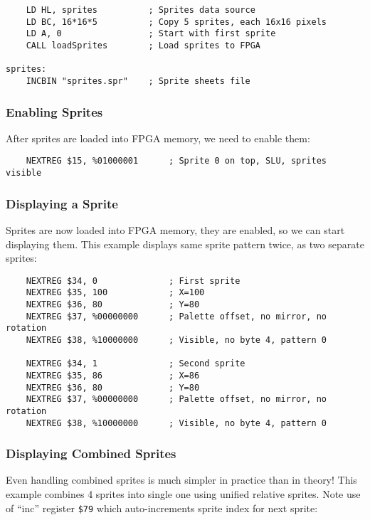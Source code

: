 \begin{lstlisting}
    LD HL, sprites          ; Sprites data source
    LD BC, 16*16*5          ; Copy 5 sprites, each 16x16 pixels
    LD A, 0                 ; Start with first sprite
    CALL loadSprites        ; Load sprites to FPGA

sprites:
    INCBIN "sprites.spr"    ; Sprite sheets file
\end{lstlisting}


\subsubsection{Enabling Sprites}

After sprites are loaded into FPGA memory, we need to enable them:

\begin{lstlisting}
    NEXTREG $15, %01000001		; Sprite 0 on top, SLU, sprites visible
\end{lstlisting}


\subsubsection{Displaying a Sprite}

Sprites are now loaded into FPGA memory, they are enabled, so we can start displaying them. This example displays same sprite pattern twice, as two separate sprites:

\begin{lstlisting}
    NEXTREG $34, 0              ; First sprite
    NEXTREG $35, 100            ; X=100
    NEXTREG $36, 80             ; Y=80
    NEXTREG $37, %00000000      ; Palette offset, no mirror, no rotation
    NEXTREG $38, %10000000      ; Visible, no byte 4, pattern 0

    NEXTREG $34, 1              ; Second sprite
    NEXTREG $35, 86             ; X=86
    NEXTREG $36, 80             ; Y=80
    NEXTREG $37, %00000000      ; Palette offset, no mirror, no rotation
    NEXTREG $38, %10000000      ; Visible, no byte 4, pattern 0
\end{lstlisting}


\pagebreak
\subsubsection{Displaying Combined Sprites}

Even handling combined sprites is much simpler in practice than in theory! This example combines 4 sprites into single one using unified relative sprites. Note use of ``inc'' register {\tt \$79} which auto-increments sprite index for next sprite:

